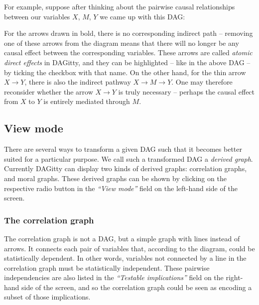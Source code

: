 \documentclass[a4paper,10pt]{article}
\newcommand{\pname}{{\sc DAG}itty\xspace}
\newcommand{\action}[1]{\emph{``#1''}}
\begin{document}
For example, suppose after thinking about the pairwise causal relationships between
our variables $X$, $M$, $Y$ we came up with this DAG:


For the arrows drawn in bold, there is no corresponding indirect path -- removing
one of these arrows from the diagram means that there will no longer be any causal 
effect between the corresponding variables. These arrows are called \emph{atomic direct
effects} in \pname, and they can be highlighted -- like in the above DAG -- by ticking
the checkbox with that name. 
On the other hand, for the thin arrow 
$X \to Y$, there is also the indirect pathway $X \to M \to Y$. One may therefore reconsider
whether the arrow $X \to Y$ is truly necessary -- 
perhaps the causal effect from $X$ to $Y$ is entirely mediated through $M$.

\subsection{View mode}

There are several ways to transform a given DAG such that it becomes better suited for 
a particular purpose. We call such a transformed DAG a \emph{derived graph}. Currently
\pname can display two kinds of derived graphs: correlation graphs, and moral graphs.
These derived graphs can be shown by clicking on the respective radio button in the
\action{View mode} field on the left-hand side of the screen. 

\subsubsection{The correlation graph}

The correlation graph is not a DAG, but a simple graph with lines instead of arrows. 
It connects each pair of variables that, according to the diagram, could be statistically
dependent. In other words, variables not connected by a line in the correlation graph
must be statistically independent. These pairwise independencies are also listed in the
\action{Testable implications} field on the right-hand side of the screen, and so the
correlation graph could be seen as encoding a subset of those implications. 
\end{document}
